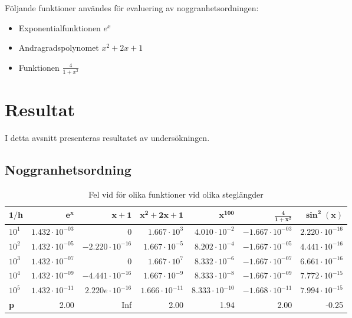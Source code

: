 \documentclass[a4paper,titlepage]{article}
\begin{document}
Följande funktioner användes för evaluering av noggranhetsordningen:

\begin{itemize}
    \item Exponentialfunktionen $e^x$
    \item Andragradspolynomet $x^2 + 2x + 1$
    \item Funktionen $\frac{4}{1 + x^2}$
\end{itemize}

\section{Resultat}

I detta avsnitt presenteras resultatet av undersökningen.

\subsection{Noggranhetsordning}

\begin{table}[h]
    \begin{tabular}{l | r | r | r | r | r | r}
        $\mathbf{1/h}$ & $\mathbf{e^x}$ & $\mathbf{x + 1}$ & $\mathbf{x^2 + 2x + 1}$ & $\mathbf{x^{100}}$ & $\mathbf{\frac{4}{1 + x^2}}$ & $\mathbf{\sin^2(x)}$ \\ \hline
        $10^1$         & $1.432 \cdot 10^{-03}$ & $0                    $  & $1.667 \cdot 10^{3}  $ & $4.010 \cdot 10^{-2} $ & $-1.667 \cdot 10^{-03}$ & $2.220 \cdot 10^{-16}$ \\
        $10^2$         & $1.432 \cdot 10^{-05}$ & $-2.220 \cdot 10^{-16}$  & $1.667 \cdot 10^{-5} $ & $8.202 \cdot 10^{-4} $ & $-1.667 \cdot 10^{-05}$ & $4.441 \cdot 10^{-16}$ \\
        $10^3$         & $1.432 \cdot 10^{-07}$ & $0                    $  & $1.667 \cdot 10^{7}  $ & $8.332 \cdot 10^{-6} $ & $-1.667 \cdot 10^{-07}$ & $6.661 \cdot 10^{-16}$ \\
        $10^4$         & $1.432 \cdot 10^{-09}$ & $-4.441 \cdot 10^{-16}$  & $1.667 \cdot 10^{-9} $ & $8.333 \cdot 10^{-8} $ & $-1.667 \cdot 10^{-09}$ & $7.772 \cdot 10^{-15}$ \\
        $10^5$         & $1.432 \cdot 10^{-11}$ & $2.220e \cdot 10^{-16}$  & $1.666 \cdot 10^{-11}$ & $8.333 \cdot 10^{-10}$ & $-1.668 \cdot 10^{-11}$ & $7.994 \cdot 10^{-15}$ \\ \hline
        \textbf{p}     & 2.00                   & Inf                      & 2.00                   & 1.94                   & 2.00                    & -0.25 \\
    \end{tabular}
    \caption{Fel vid för olika funktioner vid olika steglängder}
    \label{tab:errors}
\end{table}
\end{document}

